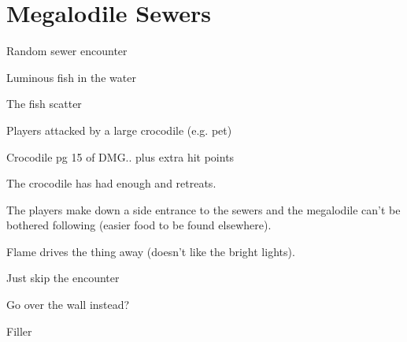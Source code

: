 \documentclass[a4paper]{dnd5}
\begin{document}
\section*{Megalodile Sewers}

\begin{precis}
\item Random sewer encounter
\item Luminous fish in the water
\item The fish scatter 
\item Players attacked by a large crocodile (e.g. pet)
\item Crocodile pg 15 of DMG.. plus extra hit points
\end{precis}

\begin{outs} 
\item The crocodile has had enough and retreats.
\item The players make down a side entrance to the sewers and the megalodile can't be bothered following (easier food to be found elsewhere).
\item Flame drives the thing away (doesn't like the bright lights).
\item Just skip the encounter
\item Go over the wall instead?
\end{outs}

\begin{purpose}
\item Filler
\item 
\end{purpose}
     
\end{document}
